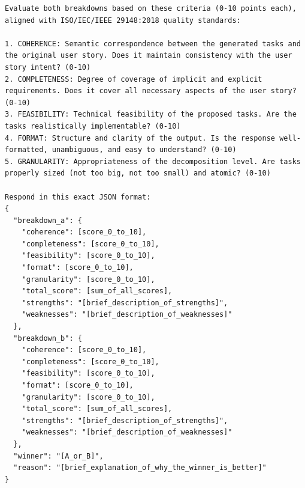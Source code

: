 \documentclass[pdflatex,sn-mathphys-num]{sn-jnl}%
\theoremstyle{thmstyleone}%
\theoremstyle{thmstyletwo}%
\theoremstyle{thmstylethree}%
\begin{document}
\begin{appendices}
\begin{lstlisting}[basicstyle=\ttfamily\small, breaklines=true, caption={LLM-as-a-Judge Prompt}, label={lst:llm_judge_prompt}]
Evaluate both breakdowns based on these criteria (0-10 points each), aligned with ISO/IEC/IEEE 29148:2018 quality standards:

1. COHERENCE: Semantic correspondence between the generated tasks and the original user story. Does it maintain consistency with the user story intent? (0-10)
2. COMPLETENESS: Degree of coverage of implicit and explicit requirements. Does it cover all necessary aspects of the user story? (0-10)
3. FEASIBILITY: Technical feasibility of the proposed tasks. Are the tasks realistically implementable? (0-10)
4. FORMAT: Structure and clarity of the output. Is the response well-formatted, unambiguous, and easy to understand? (0-10)
5. GRANULARITY: Appropriateness of the decomposition level. Are tasks properly sized (not too big, not too small) and atomic? (0-10)

Respond in this exact JSON format:
{
  "breakdown_a": {
    "coherence": [score_0_to_10],
    "completeness": [score_0_to_10],
    "feasibility": [score_0_to_10],
    "format": [score_0_to_10],
    "granularity": [score_0_to_10],
    "total_score": [sum_of_all_scores],
    "strengths": "[brief_description_of_strengths]",
    "weaknesses": "[brief_description_of_weaknesses]"
  },
  "breakdown_b": {
    "coherence": [score_0_to_10],
    "completeness": [score_0_to_10],
    "feasibility": [score_0_to_10],
    "format": [score_0_to_10],
    "granularity": [score_0_to_10],
    "total_score": [sum_of_all_scores],
    "strengths": "[brief_description_of_strengths]",
    "weaknesses": "[brief_description_of_weaknesses]"
  },
  "winner": "[A_or_B]",
  "reason": "[brief_explanation_of_why_the_winner_is_better]"
}
\end{lstlisting}

\end{appendices}


\end{document}
